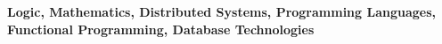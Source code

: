 
\textbf{\small Logic, Mathematics, Distributed Systems, Programming Languages, 
Functional Programming, Database Technologies}
